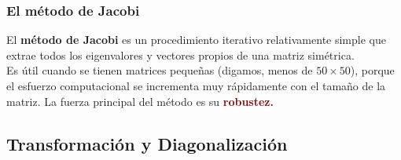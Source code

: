 \documentclass[12pt]{beamer}
\begin{document}
\begin{frame}
\frametitle{El método de Jacobi}
El \textbf{\textcolor{darkcoral}{método de Jacobi}} es un procedimiento iterativo relativamente simple que extrae todos los eigenvalores y vectores propios de una matriz simétrica.
\\
\bigskip
Es útil cuando se tienen matrices pequeñas (digamos, menos de $50 \times 50$), porque el esfuerzo computacional se incrementa muy rápidamente con el tamaño de la matriz. \pause La fuerza principal del método es su \textbf{\textcolor{darkred}{robustez.}}
\end{frame}

\subsection{Transformación y Diagonalización}
\end{document}

